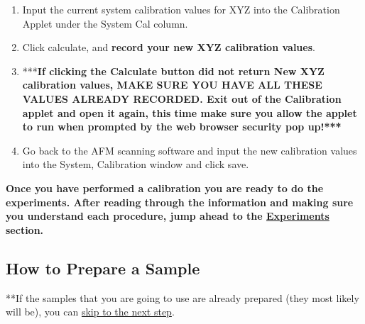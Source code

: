 \documentclass{../lab}
\begin{document}
\begin{enumerate}
    \item Input the current system calibration values for XYZ into the Calibration Applet under the System Cal column.

    \item Click calculate, and \textbf{record your new XYZ calibration values}.

    \item ***\textbf{If clicking the Calculate button did not return New XYZ calibration values, MAKE SURE YOU HAVE ALL THESE VALUES ALREADY RECORDED.  Exit out of the Calibration applet and open it again, this time make sure you allow the applet to run when prompted by the web browser security pop up!***}

    \item Go back to the AFM scanning software and input the new calibration values into the System, Calibration window and click save.
\end{enumerate}

\textbf{Once you have performed a calibration you are ready to do the experiments.  After reading through the information and making sure you understand each procedure, jump ahead to the \hyperref[sec:Experiments]{Experiments} section.}

\subsection{How to Prepare a Sample}
\label{subsec:HowToPrepareASample}

**If the samples that you are going to use are already prepared (they most likely will be), you can \hyperref[subsec:TipApproach]{skip to the next step}.
\end{document}
